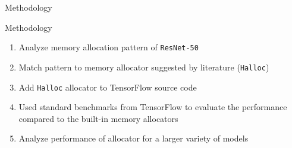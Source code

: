 \documentclass[10pt]{beamer}
\begin{document}
%
%
%

\begin{frame}[fragile]{Methodology}


\begin{alertblock}{Methodology}
\begin{enumerate}
    \item Analyze memory allocation pattern of \texttt{ResNet-50}
    \item Match pattern to memory allocator suggested by literature (\texttt{Halloc})
    \item Add \texttt{Halloc} allocator to TensorFlow source code
    \item Used standard benchmarks from TensorFlow to evaluate the performance compared to the built-in memory allocators
    \item Analyze performance of allocator for a larger variety of models
\end{enumerate}

\end{alertblock}
\end{frame}




\end{document}
